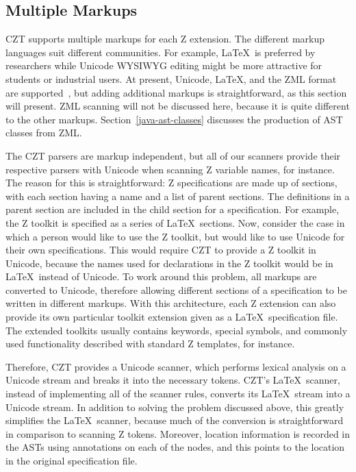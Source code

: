 \documentclass{llncs}
\begin{document}
\subsection{Multiple Markups}\label{multiple-markups}

 CZT supports multiple markups for each Z extension.  The different
 markup languages suit different communities.  For example, \LaTeX\
 is preferred by researchers while Unicode WYSIWYG editing might be
 more attractive for students or industrial users. At present,
 Unicode, \LaTeX, and the ZML format are supported~\cite{UttEA:03},
 but adding additional markups is straightforward, as this section
 will present.  ZML scanning will not be discussed here, because it is
 quite different to the other markups. Section~\ref{java-ast-classes}
 discusses the production of AST classes from ZML.

The CZT parsers are markup independent, but all of our scanners
provide their respective parsers with Unicode when scanning Z variable
names, for instance. The reason for this is straightforward: Z specifications
are made up of sections, with each section having a name and a list of
parent sections. The definitions in a parent section are included in
the child section for a specification. For example, the Z toolkit is
specified as a series of \LaTeX\ sections. Now, consider the case in
which a person would like to use the Z toolkit, but would like to use
Unicode for their own specifications. This would require CZT to
provide a Z toolkit in Unicode, because the names used for
declarations in the Z toolkit would be in \LaTeX~instead of
Unicode. To work around this problem, all markups are converted to
Unicode, therefore allowing different sections of a specification to
be written in different markups.
With this architecture, each Z extension can also provide its own
particular toolkit extension given as a \LaTeX\ specification file.
The extended toolkits usually contains keywords, special symbols,
and commonly used functionality described with standard Z templates, for instance.

Therefore, CZT provides a Unicode scanner, which performs lexical
analysis on a Unicode stream and breaks it into the necessary
tokens. CZT's \LaTeX~scanner, instead of implementing all of the
scanner rules, converts its \LaTeX~stream into a Unicode stream. In
addition to solving the problem discussed above, this greatly
simplifies the \LaTeX~scanner, because much of the conversion is
straightforward in comparison to scanning Z tokens. Moreover, location
information is recorded in the ASTs using annotations on each of the
nodes, and this points to the location in the original specification file.
\end{document}
